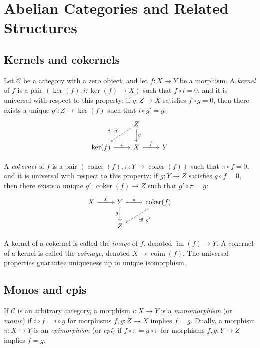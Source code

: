 \documentclass[11pt]{article}
\theoremstyle{definition}
\begin{document}
\section{Abelian Categories and Related Structures}

\subsection{Kernels and cokernels}
Let \( \mathcal{C} \) be a category with a zero object, and let \( f: X \to Y \) be a morphism.
A \emph{kernel} of \(f\) is a pair \( (\ker(f), i: \ker(f) \to X) \) such that \( f \circ i = 0 \), and it is universal with respect to this property: if \( g: Z \to X \) satisfies \( f \circ g = 0 \), then there exists a unique \( g': Z \to \ker(f) \) such that \( i \circ g' = g \):
\[
\begin{tikzcd}
& Z \arrow[dashed]{dl}[swap]{\exists!\ g'} \arrow{d}{g} \\
\ker(f) \arrow{r}{i} & X \arrow{r}{f} & Y
\end{tikzcd}
\]

A \emph{cokernel} of \(f\) is a pair \( (\operatorname{coker}(f), \pi: Y \to \operatorname{coker}(f)) \) such that \( \pi \circ f = 0 \), and it is universal with respect to this property: if \( g: Y \to Z \) satisfies \( g \circ f = 0 \), then there exists a unique \( g': \operatorname{coker}(f) \to Z \) such that \( g' \circ \pi = g \):
\[
\begin{tikzcd}
X \arrow{r}{f} & Y \arrow{r}{\pi} \arrow{d}[swap]{g} & \operatorname{coker}(f) \arrow[dashed]{dl}{\exists!\ g'} \\
& Z
\end{tikzcd}
\]

A kernel of a cokernel is called the \emph{image} of \(f\), denoted \( \operatorname{im}(f) \to Y \). A cokernel of a kernel is called the \emph{coimage}, denoted \( X \to \operatorname{coim}(f) \). The universal properties guarantee uniqueness up to unique isomorphism.

\subsection{Monos and epis}
If \( \mathcal{C} \) is an arbitrary category, a morphism \( i: X \to Y \) is a \emph{monomorphism} (or \emph{monic}) if \( i \circ f = i \circ g \) for morphisms \( f, g: Z \to X \) implies \( f = g \). Dually, a morphism \( \pi: X \to Y \) is an \emph{epimorphism} (or \emph{epi}) if \( f \circ \pi = g \circ \pi \) for morphisms \( f, g: Y \to Z \) implies \( f = g \).
\end{document}
